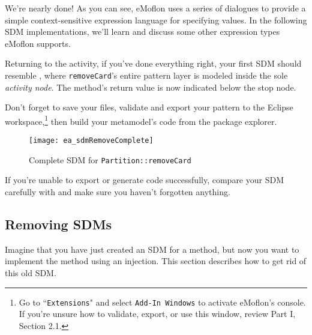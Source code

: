 \begin{stepbystep}
\vspace{0.5cm}

We're nearly done! As you can see, eMoflon uses a series of dialogues to provide a simple context-sensitive expression language for specifying  values. In the
following SDM implementations, we'll learn and discuss some other expression types eMoflon supports.

\vspace{0.5cm}

\item Returning to the activity, if you've done everything right, your first SDM should resemble
, where \texttt{removeCard}'s entire pattern layer is modeled inside the sole \emph{activity node}. The method's return
value is now indicated below the stop node.

\vspace{0.5cm}

\item  Don't forget to save your files, validate and export your pattern to the Eclipse workspace,\footnote{Go to
``\texttt{Extensions}" and select \texttt{Add-In Windows} to activate eMoflon's console. If you're unsure how to validate, export, or use this window, review
Part I, Section 2.1.} then build your metamodel's code from the package explorer.

\newpage

\begin{figure}[htbp]
\begin{center}
  \texttt{[image: ea\_sdmRemoveComplete]}
  \caption{Complete SDM for \texttt{Partition::removeCard}}  
  \label{ea:sdm_complete_control_flow}
\end{center}
\end{figure}

\item If you're unable to export or generate code successfully, compare your SDM carefully with 
and make sure you haven't forgotten anything.

\vspace{0.5cm}

\end{stepbystep}


\subsection*{Removing SDMs}

Imagine that you have just created an SDM for a method, but now you want to implement the method using an injection.
This section describes how to get rid of this old SDM.

